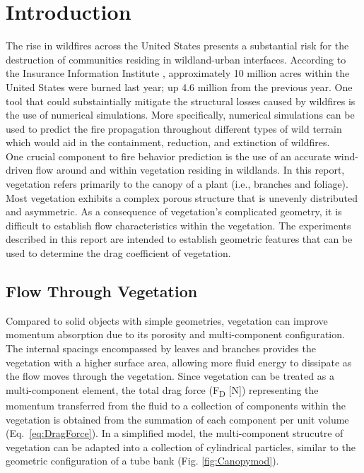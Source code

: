 \documentclass[12pt]{article}
\begin{document}
\section{Introduction}
\label{sec:intro}
\normalsize The rise in wildfires across the United States presents a substantial risk for the destruction of communities residing in wildland-urban interfaces. According to the Insurance Information Institute \cite{InsuranceInformationInstitute}, approximately 10 million acres within the United States were burned last year; up 4.6 million from the previous year. One tool that could substaintially mitigate the structural losses caused by wildfires is the use of numerical simulations. More specifically, numerical simulations can be used to predict the fire propagation throughout different types of wild terrain which would aid in the containment, reduction, and extinction of wildfires.\\
\indent One crucial component to fire behavior prediction is the use of an accurate wind-driven flow around and within vegetation residing in wildlands. In this report, vegetation refers primarily to the canopy of a plant (i.e., branches and foliage). Most vegetation exhibits a complex porous structure that is unevenly distributed and asymmetric. As a consequence of vegetation's complicated geometry, it is difficult to establish flow characteristics within the vegetation. The experiments described in this report are intended to establish geometric features that can be used to determine the drag coefficient of vegetation.

\subsection{Flow Through Vegetation}
\label{ssec:headingscap}
Compared to solid objects with simple geometries, vegetation can improve momentum absorption due to its porosity and multi-component configuration. The internal spacings encompassed by leaves and branches provides the vegetation with a higher surface area, allowing more fluid energy to dissipate as the flow moves through the vegetation. Since vegetation can be treated as a multi-component element, the total drag force (F\textsubscript{D} [\si{N}]) representing the momentum transferred from the fluid to a collection of components within the vegetation is obtained from the summation of each component per unit volume (Eq.~\ref{eq:DragForce}). In a simplified model, the multi-component strucutre of vegetation can be adapted into a collection of cylindrical particles, similar to the geometric configuration of a tube bank (Fig. \ref{fig:Canopymod}).
\end{document}
